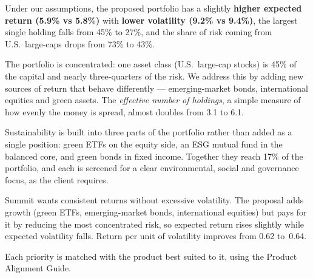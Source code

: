 \documentclass[11pt]{article}
\let\oldsubheading\subheading
\renewcommand{\subheading}[1]{\Needspace{6\baselineskip}\oldsubheading{#1}}
\let\oldheading\heading
\renewcommand{\heading}[1]{\Needspace{8\baselineskip}\oldheading{#1}}
\begin{document}
Under our assumptions, the proposed portfolio has a slightly
\textbf{higher expected return (5.9\% vs 5.8\%)} with \textbf{lower volatility
(9.2\% vs 9.4\%)}, the largest single holding falls from 45\% to 27\%, and the
share of risk coming from U.S.\ large-caps drops from 73\% to 43\%.



The portfolio is concentrated: one asset class (U.S.\ large-cap stocks) is
45\% of the capital and nearly three-quarters of the risk. We address this by
adding new sources of return that behave differently --- emerging-market
bonds, international equities and green assets. The \emph{effective number of
holdings}, a simple measure of how evenly the money is spread, almost doubles
from 3.1 to 6.1.

Sustainability is built into three parts of the portfolio rather than added
as a single position: green ETFs on the equity side, an ESG mutual fund in
the balanced core, and green bonds in fixed income. Together they reach 17\%
of the portfolio, and each is screened for a clear environmental, social and
governance focus, as the client requires.

Summit wants consistent returns without excessive volatility. The proposal
adds growth (green ETFs, emerging-market bonds, international equities) but
pays for it by reducing the most concentrated risk, so expected return rises
slightly while expected volatility falls. Return per unit of volatility
improves from 0.62 to~0.64.

Each priority is matched with the product best suited to it, using the
Product Alignment Guide.
\end{document}
